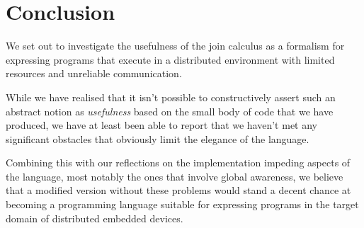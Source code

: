 \section{Conclusion}

We set out to investigate the usefulness of the join calculus as a
formalism for expressing programs that execute in a distributed environment with
limited resources and unreliable communication.

While we have realised that it isn't possible to constructively assert such an
abstract notion as \emph{usefulness} based on the small body of code that we have
produced, we have at least been able to report that we haven't met any
significant obstacles that obviously limit the elegance of the language.

Combining this with our reflections on the implementation impeding aspects of
the language, most notably the ones that involve global awareness, we believe
that a modified version without these problems would stand a decent chance at
becoming a programming language suitable for expressing programs in the
target domain of distributed embedded devices.
